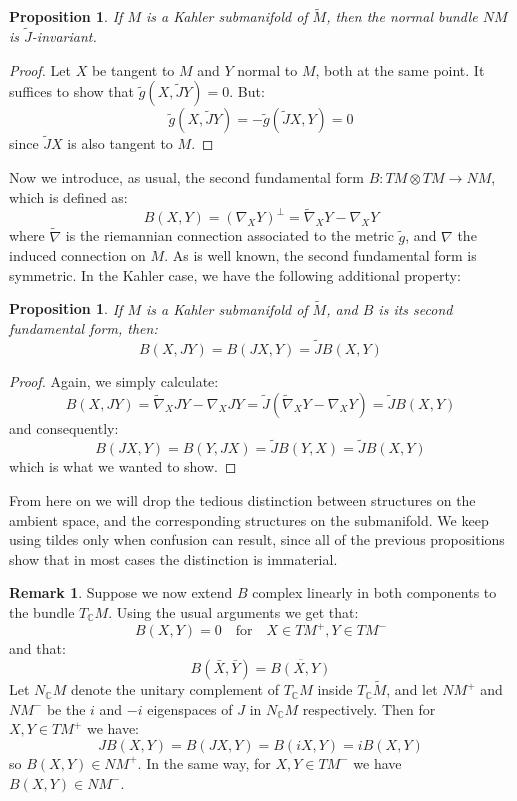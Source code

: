 \documentclass[11pt]{amsart}
\newtheorem{prop}[subsection]{Proposition}
\theoremstyle{definition}
\newtheorem{remark}[subsection]{Remark}
\def \C{ \mathbb{C} }
\def \Mamb{ \mathcal{M} }
\def \Mamb{ \tilde{M} }
\def \Jamb{ \tilde{J} }
\def \gamb{ \tilde{g} }
\def \nablaamb{ \tilde{\nabla} }
\begin{document}
\begin{prop} If $M$ is a Kahler submanifold of $\Mamb$, then the normal bundle $N M$ is $\Jamb$-invariant.
\end{prop}

\begin{proof} 
%
Let $X$ be tangent to $M$ and $Y$ normal to $M$, both at the same point.  It suffices to show that $\gamb (X, \Jamb Y) = 0$.  But:
%
$$ \gamb (X, \Jamb Y) = - \gamb ( \Jamb X, Y) = 0 $$
%
since $ \Jamb X$ is also tangent to $M$.
%
\end{proof}

Now we introduce, as usual, the second fundamental form $B: TM \otimes TM \rightarrow NM$, which is defined as:
%
$$ B(X,Y) = (\nabla_X Y)^{\perp} = \nablaamb_X Y - \nabla_X Y $$
%
where $\nablaamb$ is the riemannian connection associated to the metric $\gamb$, and $\nabla$ the induced connection on $M$.  As is well known, the second fundamental form is symmetric.  In the Kahler case, we have the following additional property:
%
\begin{prop}
%
If $M$ is a Kahler submanifold of $\Mamb$, and $B$ is its second fundamental form, then:
%
$$ B(X,JY) = B(JX,Y) = \Jamb B(X,Y) $$
%
\end{prop}

\begin{proof}
%
Again, we simply calculate:
%
$$ B(X, JY) = \nablaamb_X J Y - \nabla_X JY = \Jamb ( \nablaamb_X Y - \nabla_X Y ) = \Jamb B(X,Y) $$
% 
and consequently:
%
$$ B( JX, Y ) = B( Y, JX ) = \Jamb B (Y,X) = \Jamb B(X,Y) $$
%
which is what we wanted to show.
%
\end{proof}

From here on we will drop the tedious distinction between structures on the ambient space, and the corresponding structures on the submanifold. We keep using tildes only when confusion can result, since all of the previous propositions show that in most cases the distinction is immaterial.

\begin{remark}  Suppose we now extend $B$ complex linearly in both components to the bundle $T_{\C}M$.  Using the usual arguments we get that:
%
$$ B(X,Y) = 0 \quad \text{for} \quad X \in TM^{+}, Y \in TM^{-} $$
%
and that:
%
$$ B(\bar{X}, \bar{Y} ) = \overline{ B(X,Y) } $$
%
Let $N_{\C}M$ denote the unitary complement of $T_{\C}M$ inside $T_{\C} \Mamb$, and let $NM^{+}$ and $NM^{-}$ be the $i$ and $-i$ eigenspaces of $J$ in $N_{\C}M$ respectively.  Then for $X,Y \in TM^{+}$ we have:
%
$$ J B(X,Y) = B( JX, Y ) = B( iX, Y ) = i B(X,Y) $$
%
so $B(X,Y) \in NM^{+}$.  In the same way, for $X,Y \in TM^{-}$ we have $B(X,Y) \in NM^{-}$.
%
\end{remark}
\end{document}
